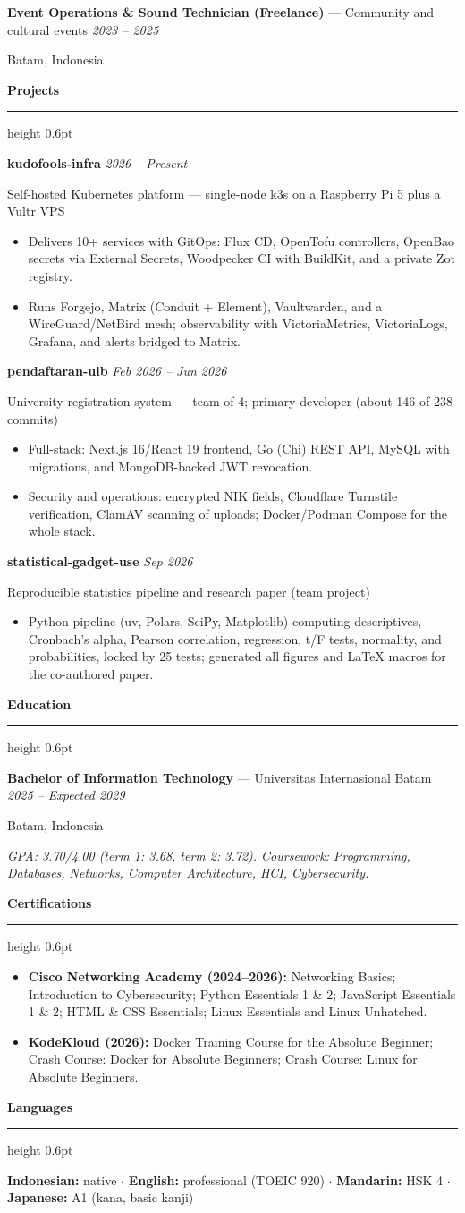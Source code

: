 \documentclass[10pt,a4paper]{article}
\newcommand{\cvsection}[1]{%
  \vspace{3pt}%
  {\large\bfseries #1}\par\vspace{1pt}%
  \hrule height 0.6pt\vspace{2pt}%
}
\newcommand{\cventry}[4]{%
  \textbf{#1} --- #2 \hfill \textit{#4}\par
  {\small #3}\par
}
\newcommand{\projentry}[3]{%
  \textbf{#1} \hfill \textit{#3}\par
  {\small #2}\par
}
\begin{document}
\cventry{Event Operations \& Sound Technician (Freelance)}{Community and cultural events}{Batam, Indonesia}{2023 -- 2025}

\cvsection{Projects}

\projentry{kudofools-infra}{Self-hosted Kubernetes platform --- single-node k3s on a Raspberry Pi 5 plus a Vultr VPS}{2026 -- Present}
\begin{itemize}
  \item Delivers 10+ services with GitOps: Flux CD, OpenTofu controllers, OpenBao secrets via External Secrets, Woodpecker CI with BuildKit, and a private Zot registry.
  \item Runs Forgejo, Matrix (Conduit + Element), Vaultwarden, and a WireGuard/NetBird mesh; observability with VictoriaMetrics, VictoriaLogs, Grafana, and alerts bridged to Matrix.
\end{itemize}

\projentry{pendaftaran-uib}{University registration system --- team of 4; primary developer (about 146 of 238 commits)}{Feb 2026 -- Jun 2026}
\begin{itemize}
  \item Full-stack: Next.js 16/React 19 frontend, Go (Chi) REST API, MySQL with migrations, and MongoDB-backed JWT revocation.
  \item Security and operations: encrypted NIK fields, Cloudflare Turnstile verification, ClamAV scanning of uploads; Docker/Podman Compose for the whole stack.
\end{itemize}

\projentry{statistical-gadget-use}{Reproducible statistics pipeline and research paper (team project)}{Sep 2026}
\begin{itemize}
  \item Python pipeline (uv, Polars, SciPy, Matplotlib) computing descriptives, Cronbach's alpha, Pearson correlation, regression, t/F tests, normality, and probabilities, locked by 25 tests; generated all figures and LaTeX macros for the co-authored paper.
\end{itemize}

\cvsection{Education}

\cventry{Bachelor of Information Technology}{Universitas Internasional Batam}{Batam, Indonesia}{2025 -- Expected 2029}
\textit{GPA: 3.70/4.00 (term 1: 3.68, term 2: 3.72). Coursework: Programming, Databases, Networks, Computer Architecture, HCI, Cybersecurity.}

\cvsection{Certifications}

\begin{itemize}
  \item \textbf{Cisco Networking Academy (2024--2026):} Networking Basics; Introduction to Cybersecurity; Python Essentials 1 \& 2; JavaScript Essentials 1 \& 2; HTML \& CSS Essentials; Linux Essentials and Linux Unhatched.
  \item \textbf{KodeKloud (2026):} Docker Training Course for the Absolute Beginner; Crash Course: Docker for Absolute Beginners; Crash Course: Linux for Absolute Beginners.
\end{itemize}

\cvsection{Languages}

\textbf{Indonesian:} native $\cdot$ \textbf{English:} professional (TOEIC 920) $\cdot$ \textbf{Mandarin:} HSK 4 $\cdot$ \textbf{Japanese:} A1 (kana, basic kanji)
\end{document}
